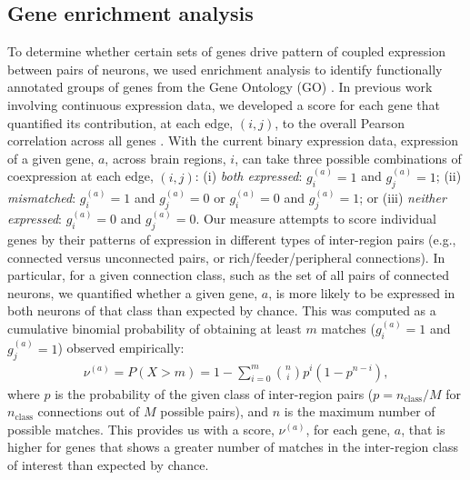 \documentclass[10pt,letterpaper]{article}
\begin{document}
\subsection*{Gene enrichment analysis}
To determine whether certain sets of genes drive pattern of coupled expression between pairs of neurons, we used enrichment analysis to identify functionally annotated groups of genes from the Gene Ontology (GO) \cite{Ashburner2000}.
In previous work involving continuous expression data, we developed a score for each gene that quantified its contribution, at each edge, $(i,j)$, to the overall Pearson correlation across all genes \cite{Fulcher:2016ck}.
With the current binary expression data, expression of a given gene, $a$, across brain regions, $i$, can take three possible combinations of coexpression at each edge, $(i,j)$:
(i) \emph{both expressed}: $g^{(a)}_i = 1$ and $g^{(a)}_j = 1$;
(ii) \emph{mismatched}: $g^{(a)}_i = 1$ and $g^{(a)}_j = 0$ or $g^{(a)}_i = 0$ and $g^{(a)}_j = 1$; or
(iii) \emph{neither expressed}: $g^{(a)}_i = 0$ and $g^{(a)}_j = 0$.
Our measure attempts to score individual genes by their patterns of expression in different types of inter-region pairs (e.g., connected versus unconnected pairs, or rich/feeder/peripheral connections).
In particular, for a given connection class, such as the set of all pairs of connected neurons, we quantified whether a given gene, $a$, is more likely to be expressed in both neurons of that class than expected by chance.
This was computed as a cumulative binomial probability of obtaining at least $m$ matches ($g^{(a)}_i = 1$ and $g^{(a)}_j = 1$) observed empirically:
\begin{eqnarray}
	\label{eq:CBinomialProbability}
     \nu^{(a)} = P(X > m) = 1 - \sum_{i=0}^{m}\binom{n}{i} p^{i}(1-p^{n-i}),
\end{eqnarray}
where $p$ is the probability of the given class of inter-region pairs ($p = n_\mathrm{class}/M$ for $n_\mathrm{class}$ connections out of $M$ possible pairs), and $n$ is the maximum number of possible matches.
This provides us with a score, $\nu^{(a)}$, for each gene, $a$, that is higher for genes that shows a greater number of matches in the inter-region class of interest than expected by chance.
\end{document}
